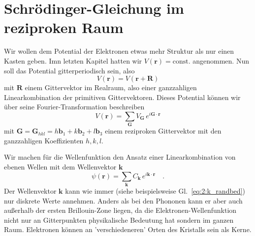  



\section*{Schrödinger-Gleichung im reziproken Raum}

Wir wollen  dem Potential der Elektronen etwas mehr Struktur als nur einen Kasten geben. Imn letzten Kapitel hatten wir $V(\mathbf{r}) = \text{const.}$ angenommen. Nun soll das Potential gitterperiodisch sein, also
\begin{equation}
    V(\mathbf{r}) = V(\mathbf{r} + \mathbf{R})
\end{equation} 
mit $\mathbf{R}$ einem Gittervektor im Realraum, also einer ganzzahligen Linearkombination der primitiven Gittervektoren. Dieses Potential können wir  über seine Fourier-Transformation beschreiben
\begin{equation}
    V(\mathbf{r}) = \sum_{\mathbf{G}} V_{\mathbf{G}} \, e^{i \mathbf{G} \cdot \mathbf{r} }
\end{equation} 
mit $\mathbf{G} = \mathbf{G}_{hkl} =   h \mathbf{b}_1 + k \mathbf{b}_2 + l \mathbf{b}_3$ einem reziproken Gittervektor mit den ganzzahligen Koeffizienten $h,k,l$.


Wir machen  für die Wellenfunktion den Ansatz einer Linearkombination von ebenen Wellen mit dem Wellenvektor $\mathbf{k}$
\begin{equation}
    \psi(\mathbf{r}) = \sum_{\mathbf{k}} C_{\mathbf{k}} \, e^{i \mathbf{k} \cdot \mathbf{r} } \quad . \label{eq:2_psi_allg}
\end{equation}
Der Wellenvektor  $\mathbf{k}$ kann wie immer (siehe beispielsweise  Gl.~\ref{eq:2:k_randbed}) nur diskrete Werte annehmen. Anders als bei den Phononen kann er aber auch außerhalb der ersten Brillouin-Zone liegen, da die Elektronen-Wellenfunktion  nicht nur an Gitterpunkten physikalische Bedeutung hat sondern im ganzen Raum. Elektronen können an 'verschiedeneren' Orten des Kristalls sein als Kerne.

